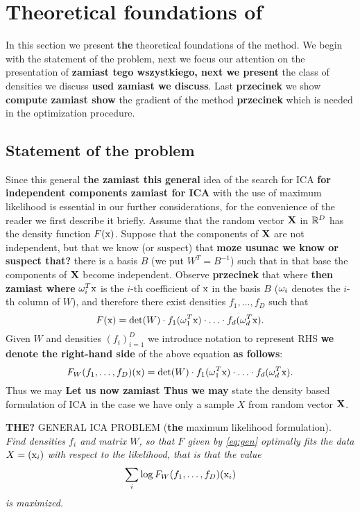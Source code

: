 \section{Theoretical foundations of \ICA{}}
\label{p}

In this section we present \textbf{the} theoretical foundations of the method.
We begin with the statement of the problem, next we focus our attention on the presentation of \textbf{zamiast tego wszystkiego, next we present} the class of densities we discuss \textbf{used zamiast we discuss}. Last \textbf{przecinek} we show \textbf{compute zamiast show} the gradient of the method \textbf{przecinek} which is needed in the optimization procedure.


\subsection{Statement of the problem}

Since this general \textbf{the zamiast this general} idea of the search for ICA \textbf{for independent components zamiast for ICA} with the use of
maximum likelihood is essential in our further considerations, for the convenience of the reader we first describe it briefly.
Assume that the random vector $\mathbf{X}$ in $\mathbb{R}^D$ has the density function $F(\mathrm{x})$.
Suppose that the components of $\mathbf{X}$ are not independent, but that
we know (or suspect) that \textbf{moze usunac we know or suspect that?} there is a basis $B$ (we put $W^T=B^{-1}$) such that in that base the
components of $\mathbf{X}$ become independent. Observe \textbf{przecinek} that where \textbf{then zamiast where} $\omega_i^T\mathrm{x}$ is the $i$-th coefficient of $\mathrm{x}$ in the basis $B$ ($\omega_i$ denotes the $i$-th column of $W$), and therefore there exist densities 
$f_1,\ldots,f_D$ such that
\begin{equation} \label{eq:gen}
F(\mathrm{x})=\det(W) \cdot f_1(\omega_1^T\mathrm{x}) \cdot \ldots \cdot f_d(\omega_d^T\mathrm{x}).
\end{equation}
Given $W$ and densities $(f_i)_{i=1}^D$ we introduce notation to represent
RHS \textbf{we denote the right-hand side} of the above equation \textbf{as follows}:
$$
F_W(f_1,\ldots,f_D)(\mathrm{x})=\det(W) \cdot f_1(\omega_1^T\mathrm{x}) \cdot \ldots \cdot f_d(\omega_d^T\mathrm{x}).
$$
Thus we may \textbf{Let us now zamiast Thus we may} state the density based formulation of ICA in the case we have only a sample
$X$ from random vector $\mathbf{X}$.

\medskip

\noindent \textbf{THE?} GENERAL ICA PROBLEM (\textbf{the} maximum likelihood formulation). \\{\em Find densities $f_i$ and matrix $W$, so that $F$ given by
\eqref{eq:gen} optimally fits the data $X=(\mathrm{x}_i)$ with respect to the likelihood, that is that the value
$$
\sum_i \log F_W(f_1,\ldots,f_D)(\mathrm{x}_i)
$$
is maximized.
}

